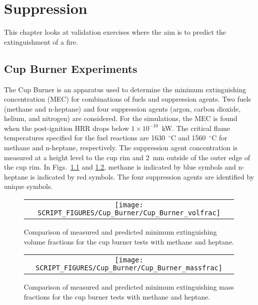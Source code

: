 
\chapter{Suppression}

This chapter looks at validation exercises where the aim is to predict the extinguishment of a fire.

\section{Cup Burner Experiments}

The Cup Burner is an apparatus used to determine the minimum extinguishing concentration (MEC) for combinations of fuels and suppression agents. Two fuels (methane and n-heptane) and four suppression agents (argon, carbon dioxide, helium, and nitrogen) are considered. For the simulations, the MEC is found when the post-ignition HRR drops below $1 \times 10^{-10}$~kW. The critical flame temperatures specified for the fuel reactions are 1630~$^\circ$C and 1560~$^\circ$C for methane and n-heptane, respectively. The suppression agent concentration is measured at a height level to the cup rim and 2~mm outside of the outer edge of the cup rim. In Figs.~\ref{cup_burner_extinguish_vol} and \ref{cup_burner_extinguish_mass}, methane is indicated by blue symbols and n-heptane is indicated by red symbols. The four suppression agents are identified by unique symbols.

\newpage

\begin{figure}[t]
\begin{center}
\begin{tabular}{c}
\texttt{[image: SCRIPT\_FIGURES/Cup\_Burner/Cup\_Burner\_volfrac]}
\end{tabular}
\end{center}
\caption[Results of Cup Burner experiments with methane and heptane]{Comparison of measured and predicted minimum extinguishing volume fractions for the cup burner tests with methane and heptane.}
\label{cup_burner_extinguish_vol}
\end{figure}


\begin{figure}[b]
\begin{center}
\begin{tabular}{c}
\texttt{[image: SCRIPT\_FIGURES/Cup\_Burner/Cup\_Burner\_massfrac]}
\end{tabular}
\end{center}
\caption[Results of Cup Burner experiments with methane and heptane]{Comparison of measured and predicted minimum extinguishing mass fractions for the cup burner tests with methane and heptane.}
\label{cup_burner_extinguish_mass}
\end{figure}


